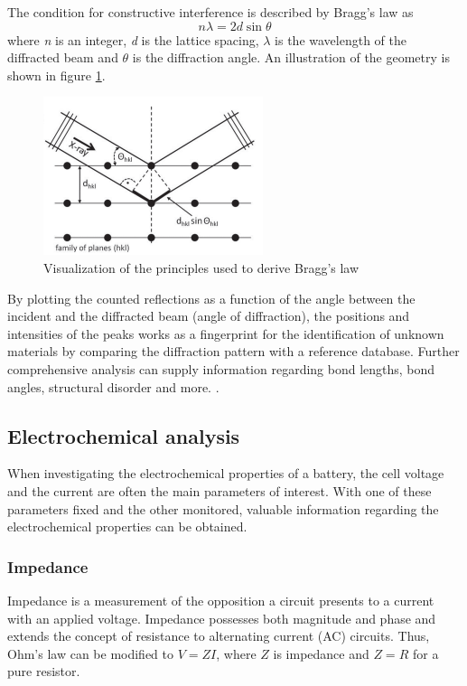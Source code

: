 \documentclass[Main/main.tex]{subfiles}
\begin{document}
The condition for constructive interference is described by Bragg's law as
    $$n\lambda = 2d\sin{\theta}$$
where \textit{n} is an integer, \textit{d} is the lattice spacing, \textit{$\lambda$} is the wavelength of the diffracted beam and \textit{$\theta$} is the diffraction angle. An illustration of the geometry is shown in figure \ref{fig:bragg}.

\begin{figure}[ht]
    \centering
    \includegraphics{uploads/Bragg.PNG}
    \caption{Visualization of the principles used to derive Bragg's law \cite{Scotman}}
    \label{fig:bragg}
\end{figure}

By plotting the counted reflections as a function of the angle between the incident and the diffracted beam (angle of diffraction), the positions and intensities of the peaks works as a fingerprint for the identification of unknown materials by comparing the diffraction pattern with a reference database. Further comprehensive analysis can supply information regarding bond lengths, bond angles, structural disorder and more. \cite{Scotman}.




\subsection{Electrochemical analysis}
When investigating the electrochemical properties of a battery, the cell voltage and the current are often the main parameters of interest. With one of these parameters fixed and the other monitored, valuable information regarding the electrochemical properties can be obtained. 

\subsubsection{Impedance}
Impedance is a measurement of the opposition a circuit presents to a current with an applied voltage. Impedance possesses both magnitude and phase and extends the concept of resistance to alternating current (AC) circuits. Thus, Ohm's law can be modified to $V = ZI$, where $Z$ is impedance and $Z=R$ for a pure resistor.
\end{document}
